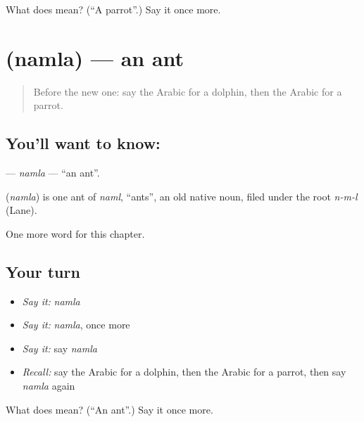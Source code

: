 \begin{tcolorbox}[breakable,colback=teal!4,colframe=teal!35!black,title={Before you move on}]
What does  mean? (\textquotedblleft{}A parrot\textquotedblright{}.) Say it once more.
\end{tcolorbox}
\section[\texorpdfstring{\ar{نملة} (namla)}{نملة (namla)}]{ (namla) — an ant}

\label{lesson:AR-C185-namla}



\begin{quote}
Before the new one: say the Arabic for a dolphin, then the Arabic for a parrot.
\end{quote}

\subsection*{You'll want to know: }
\textbf{} — \emph{namla} — \textquotedblleft{}an ant\textquotedblright{}.

\begin{cousinweb}
\textbf{} (\emph{namla}) is one ant of \emph{naml}, \textquotedblleft{}ants\textquotedblright{}, an old native noun, filed under the root \emph{n-m-l} (Lane).
\end{cousinweb}

\begin{grammarlens}[title={What you've built}]
One more word for this chapter.
\end{grammarlens}

\subsection*{Your turn}
\begin{itemize}
\raggedright
  \item \emph{Say it:} \emph{namla}
  \item \emph{Say it:} \emph{namla}, once more
  \item \emph{Say it:} say \emph{namla}
  \item \emph{Recall:} say the Arabic for a dolphin, then the Arabic for a parrot, then say \emph{namla} again
\end{itemize}

\begin{tcolorbox}[breakable,colback=teal!4,colframe=teal!35!black,title={Before you move on}]
What does  mean? (\textquotedblleft{}An ant\textquotedblright{}.) Say it once more.
\end{tcolorbox}
